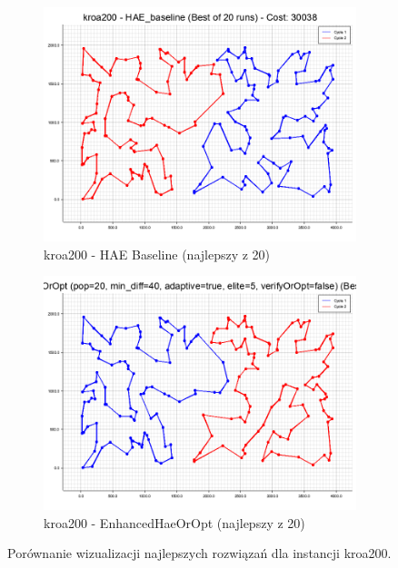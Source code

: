 \documentclass[12pt,a4paper]{article}
\begin{document}
\begin{figure}[H]
\begin{adjustwidth}{-1cm}{-1cm}
    \centering
    \begin{subfigure}[b]{0.49\textwidth}
        \centering
        \includegraphics[width=\textwidth]{output/lab7/kroa200_HAE_baseline_best.png}
        \caption{kroa200 - HAE Baseline (najlepszy z 20)}
        \label{fig:kroa200_hae}
    \end{subfigure}
    \hfill
    \begin{subfigure}[b]{0.49\textwidth}
        \centering
        \includegraphics[width=\textwidth]{output/lab7/kroa200_EnhancedHAEOrOpt_best.png}
        \caption{kroa200 - EnhancedHaeOrOpt (najlepszy z 20)}
        \label{fig:kroa200_enhanced}
    \end{subfigure}
    \caption{Porównanie wizualizacji najlepszych rozwiązań dla instancji kroa200.}
    \label{fig:kroa200_comparison}
\end{adjustwidth}
\end{figure}
\end{document}
